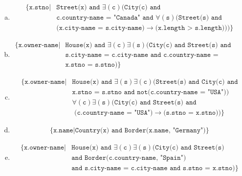 \documentclass[11pt]{article}
\def\code#1{\texttt{#1}}
\def\c#1{\texttt{#1}}
\def\expr#1#2{\{\code{#1} | #2\}}
\begin{document}
  \begin{enumerate}[a.]

    \item
      \begin{equation*}
      \begin{aligned}
        \expr{x.stno} {
          &\c{Street(x) and } \exists(\c{c})(\c{City(c) and} \\
          &\c{c.country-name = "Canada" and } \forall(\c{s})(\c{Street(s) and} \\ 
          &\c{(x.city-name = s.city-name)} \to \c{(x.length > s.length)}
        ))}
      \end{aligned}
      \end{equation*}

    \item 
      \begin{equation*}
      \begin{aligned}
        \expr{x.owner-name} {
          &\c{House(x) and } \exists(\c{c})\exists(\c{s}) (\c{City(c) and Street(s) and} \\
          &\c{s.city-name = c.city-name and c.country-name = "Canada"} \\
          &\c{x.stno = s.stno}
        )}
      \end{aligned}
      \end{equation*}

    \item
      \begin{equation*}
      \begin{aligned}
        \expr{x.owner-name} {
          &\c{House(x) and } \exists(\c{s})\exists(\c{c})(\c{Street(s) and City(c) and} \\
          &\c{x.stno = s.stno and not(c.country-name = "USA")}) \\
          &\forall(\c{c})\exists(\c{s})(\c{City(c) and Street(s) and} \\
          &\c{    (c.country-name = "USA")} \to \c{(s.stno = x.stno)})
        }
      \end{aligned}
      \end{equation*}

    \item
      \begin{equation*}
      \begin{aligned}
        \expr{x.name} {
          \c{Country(x) and Border(x.name, "Germany")}
        }
      \end{aligned}
      \end{equation*}

    \item
      \begin{equation*}
      \begin{aligned}
        \expr{x.owner-name} {
          &\c{House(x) and } \exists(\c{c})\exists(\c{s}) (\c{City(c) and Street(s)} \\
          &\c{and Border(c.country-name, "Spain")} \\
          &\c{and s.city-name = c.city-name and s.stno = x.stno}
        )}
      \end{aligned}
      \end{equation*}

  \end{enumerate}
\end{document}
